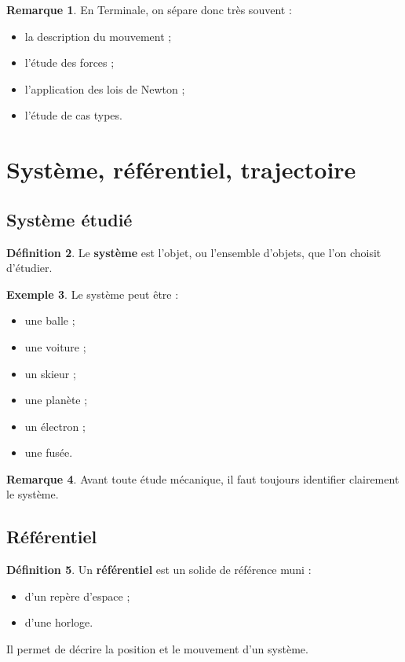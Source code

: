 \documentclass[11pt,a4paper]{article}
\theoremstyle{definition}
\newtheorem{definition}{Définition}[section]
\newtheorem{exemple}[definition]{Exemple}
\newtheorem{remarque}[definition]{Remarque}
\theoremstyle{plain}
\theoremstyle{remark}
\begin{document}
\begin{remarque}
En Terminale, on sépare donc très souvent :
\begin{itemize}
    \item la description du mouvement ;
    \item l'étude des forces ;
    \item l'application des lois de Newton ;
    \item l'étude de cas types.
\end{itemize}
\end{remarque}

\section{Système, référentiel, trajectoire}

\subsection{Système étudié}

\begin{definition}
Le \textbf{système} est l'objet, ou l'ensemble d'objets, que l'on choisit d'étudier.
\end{definition}

\begin{exemple}
Le système peut être :
\begin{itemize}
    \item une balle ;
    \item une voiture ;
    \item un skieur ;
    \item une planète ;
    \item un électron ;
    \item une fusée.
\end{itemize}
\end{exemple}

\begin{remarque}
Avant toute étude mécanique, il faut toujours identifier clairement le système.
\end{remarque}

\subsection{Référentiel}

\begin{definition}
Un \textbf{référentiel} est un solide de référence muni :
\begin{itemize}
    \item d'un repère d'espace ;
    \item d'une horloge.
\end{itemize}
Il permet de décrire la position et le mouvement d'un système.
\end{definition}
\end{document}
